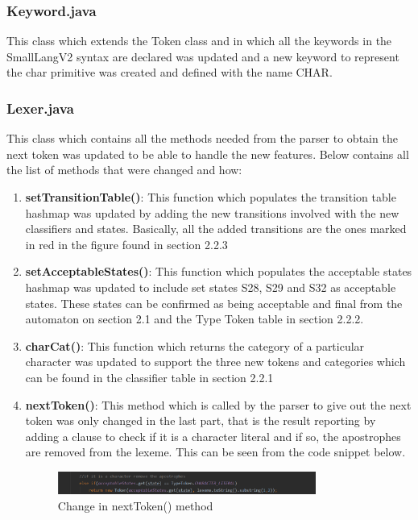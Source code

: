 \documentclass{article}
\begin{document}
					\subsubsection{Keyword.java}
					
					This class which extends the Token class and in which all the keywords in the SmallLangV2 syntax are declared was updated and a new keyword to represent the char primitive was created and defined with the name CHAR.
					
					\subsubsection{Lexer.java}
					
					This class which contains all the methods needed from the parser to obtain the next token was updated to be able to handle the new features. Below contains all the list of methods that were changed and how:
					
					\begin{enumerate}
					\item \textbf{setTransitionTable()}: This function which populates the transition table hashmap was updated by adding the new transitions involved with the new classifiers and states. Basically, all the added transitions are the ones marked in red in the figure found in section 2.2.3
					\item \textbf{setAcceptableStates()}: This function which populates the acceptable states hashmap was updated to include set states S28, S29 and S32 as acceptable states. These states can be confirmed as being acceptable and final from the automaton on section 2.1 and the Type Token table in section 2.2.2.
						\item \textbf{charCat()}: This function which returns the category of a particular character was updated to support the three new tokens and categories which can be found in the classifier table in section 2.2.1
						\item \textbf{nextToken()}: This method which is called by the parser to give out the next token was only changed in the last part, that is the result reporting by adding a clause to check if it is a character literal and if so, the apostrophes are removed from the lexeme. This can be seen from the code snippet below.
					\begin{center}
					\begin{figure}[H]
			 			\includegraphics[width=0.8\textwidth]{lexerchange.png}
			 			\centering
			  			\caption{Change in nextToken() method}
			  			\label{fig:lexerchange}
					\end{figure}
				\end{center}
						
					\end{enumerate}
					
\end{document}

